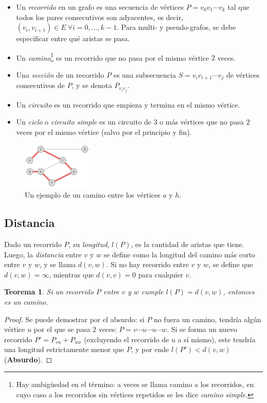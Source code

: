 \documentclass[a4paper]{report}
\newtheorem*{theorem*}{Teorema}
\begin{document}
\begin{itemize}
    \item Un \textit{recorrido} en un grafo es una secuencia de vértices $P = v_0 v_1 \cdots v_k$ tal que todos los pares consecutivos son adyacentes, es decir, $(v_i, v_{i+1}) \in E\ \forall i = 0, ..., k - 1$. Para multi- y pseudo-grafos, se debe especificar entre qué aristas se pasa.
    \item Un \textit{camino}\footnote{Hay ambigüedad en el término: a veces se llama camino a los recorridos, en cuyo caso a los recorridos sin vértices repetidos se les dice \textit{camino simple}.} es un recorrido que no pasa por el mismo vértice $2$ veces.
    \item Una \textit{sección} de un recorrido $P$ es una subsecuencia $S = v_i v_{i+1} \cdots v_j$ de vértices consecutivos de $P$, y se denota $P_{v_i v_j}$.
    \item Un \textit{circuito} es un recorrido que empieza y termina en el mismo vértice.
    \item Un \textit{ciclo} o \textit{circuito simple} es un circuito de $3$ o más vértices que no pasa $2$ veces por el mismo vértice (salvo por el principio y fin).
\end{itemize}

\begin{figure}[H]
    \centering
    \includegraphics[width=0.3\textwidth]{ejemplo_camino.png}
    \caption*{Un ejemplo de un camino entre los vértices $a$ y $h$.}
\end{figure}

\subsection{Distancia}

Dado un recorrido $P$, su \textit{longitud}, $l(P)$, es la cantidad de aristas que tiene. Luego, la \textit{distancia} entre $v$ y $w$ se define como la longitud del camino más corto entre $v$ y $w$, y se llama $d(v, w)$. Si no hay recorrido entre $v$ y $w$, se define que $d(v, w) = \infty$, mientras que $d(v, v) = 0$ para cualquier $v$.

\begin{theorem*}
    Si un recorrido $P$ entre $v$ y $w$ cumple $l(P) = d(v, w)$, entonces es un camino.
\end{theorem*}
\begin{proof}
    Se puede demostrar por el absurdo: si $P$ no fuera un camino, tendría algún vértice $u$ por el que se pasa $2$ veces: $P = v \cdots u \cdots u \cdots w$. Si se forma un nuevo recorrido $P' = P_{vu} + P_{uw}$ (excluyendo el recorrido de $u$ a sí mismo), este tendría una longitud estrictamente menor que $P$, y por ende $l(P') < d(v, w)$ (\textbf{Absurdo}).

\end{proof}
\end{document}
